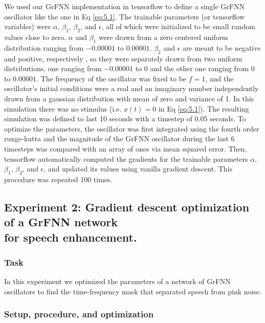 \documentclass{report}
\begin{document}
We used our GrFNN implementation in tensorflow to define a single GrFNN oscillator like the one in Eq \eqref{eq:5.1}. The trainable parameters (or tensorflow variables) were $\alpha$, $\beta_1$, $\beta_2$, and $\epsilon$, all of which were initialized to be small random values close to zero. $\alpha$ and $\beta_1$ were drawn from a zero centered uniform distribution ranging from $-0.00001$ to $0.00001$. $\beta_2$ and $\epsilon$ are meant to be negative and positive, respectively \cite{kim2015signal}, so they were separately drawn from two uniform distributions, one ranging from $-0.00001$ to $0$ and the other one ranging from $0$ to $0.00001$. The frequency of the oscillator was fixed to be $f=1$, and the oscillator's initial conditions were a real and an imaginary number independently drawn from a gaussian distribution with mean of zero and variance of 1. In this simulation there was no stimulus (i.e. $x(t)=0$ in Eq \eqref{eq:5.1}). The resulting simulation was defined to last 10 seconds with a timestep of 0.05 seconds. To optimize the parameters, the oscillator was first integrated using the fourth order runge-kutta and the magnitude of the GrFNN oscillator during the last 6 timesteps was compared with an array of ones via mean squared error. Then, tensorflow automatically computed the gradients for the trainable parameters $\alpha$, $\beta_1$, $\beta_2$, and $\epsilon$, and updated its values using vanilla gradient descent. This procedure was repeated 100 times. 

\subsection{Experiment 2: Gradient descent optimization of a GrFNN network \\ for speech enhancement.} 

\subsubsection{Task}

In this experiment we optimized the parameters of a network of GrFNN oscillators to find the time-frequency mask that separated speech from pink noise.

\subsubsection{Setup, procedure, and optimization}
\end{document}
